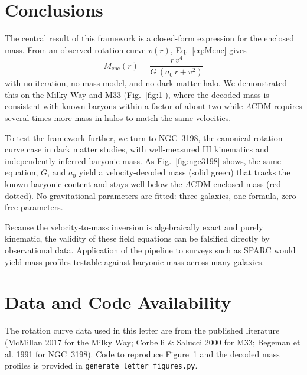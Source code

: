 \documentclass[aps,twocolumn,amsmath,amssymb,reprint,nofootinbib,nobalancelastpage]{revtex4-2}
\begin{document}
\section{Conclusions}
\label{sec:conclusions}

The central result of this framework is a closed-form expression for the enclosed mass. From an observed rotation curve $v(r)$, Eq.~\ref{eq:Menc} gives
\begin{equation*}
M_{\mathrm{enc}}(r) = \frac{r\,v^4}{G\,(a_0\,r + v^2)}
\end{equation*}
with no iteration, no mass model, and no dark matter halo. We demonstrated this on the Milky Way and M33 (Fig.~\ref{fig:1}), where the decoded mass is consistent with known baryons within a factor of about two while $\Lambda$CDM requires several times more mass in halos to match the same velocities.

To test the framework further, we turn to NGC~3198, the canonical rotation-curve case in dark matter studies, with well-measured HI kinematics and independently inferred baryonic mass. As Fig.~\ref{fig:ngc3198} shows, the same equation, $G$, and $a_0$ yield a velocity-decoded mass (solid green) that tracks the known baryonic content and stays well below the $\Lambda$CDM enclosed mass (red dotted). No gravitational parameters are fitted: three galaxies, one formula, zero free parameters.

Because the velocity-to-mass inversion is algebraically exact and purely kinematic, the validity of these field equations can be falsified directly by observational data. Application of the pipeline to surveys such as SPARC \cite{Lelli16} would yield mass profiles testable against baryonic mass across many galaxies.

\section{Data and Code Availability}
\label{sec:data}
The rotation curve data used in this letter are from the published literature (McMillan 2017 for the Milky Way; Corbelli \& Salucci 2000 for M33; Begeman et al. 1991 for NGC~3198). Code to reproduce Figure~1 and the decoded mass profiles is provided in \texttt{generate\_letter\_figures.py}.


\end{document}
